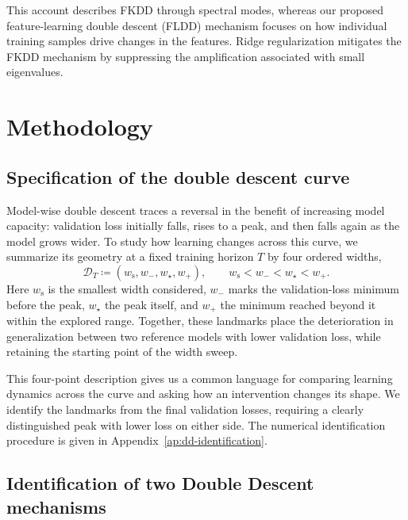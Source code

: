\documentclass[10pt]{article} %
\begin{document}
This account describes FKDD through spectral modes, whereas our proposed feature-learning double descent (FLDD) mechanism focuses on how individual training samples drive changes in the features. Ridge regularization mitigates the FKDD mechanism by suppressing the amplification associated with small eigenvalues.

\section{Methodology}

\subsection{Specification of the double descent curve}
\label{sec:dd-specification}

Model-wise double descent traces a reversal in the benefit of increasing
model capacity: validation loss initially falls, rises to a peak, and
then falls again as the model grows wider. To study how learning changes
across this curve, we summarize its geometry at a fixed training horizon
$T$ by four ordered widths,
\begin{equation}
    \mathcal{D}_T \coloneqq
    (w_{\mathrm{s}},w_-,w_\star,w_+),
    \qquad w_{\mathrm{s}}<w_-<w_\star<w_+.
    \label{eq:dd-landmarks}
\end{equation}
Here $w_{\mathrm{s}}$ is the smallest width considered, $w_-$ marks the
validation-loss minimum before the peak, $w_\star$ the peak itself, and
$w_+$ the minimum reached beyond it within the explored range.
Together, these landmarks place the deterioration in generalization
between two reference models with lower validation loss, while retaining
the starting point of the width sweep.

This four-point description gives us a common language for comparing 
learning dynamics across the curve and asking how an intervention changes
its shape. We identify the landmarks from the final validation losses,
requiring a clearly distinguished peak with lower loss on either side.
The numerical identification procedure is given in
Appendix~\ref{ap:dd-identification}.
 

\subsection{Identification of two Double Descent mechanisms}
\end{document}
